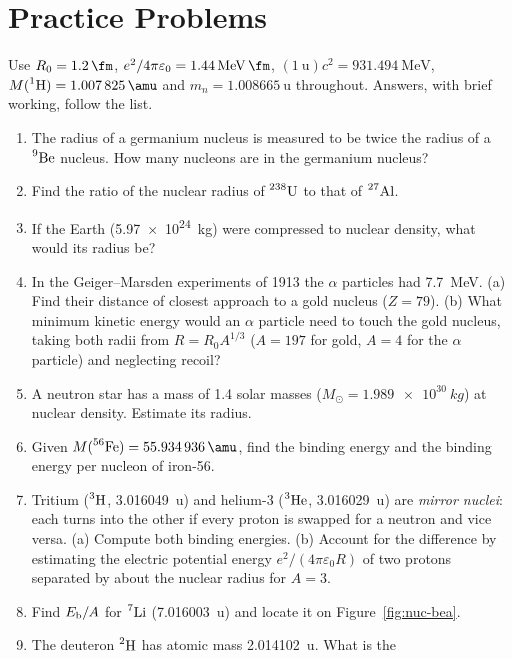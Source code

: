 \section{Practice Problems}\label{sec:nuc-practice}

Use $R_0=\SI{1.2}{\fm}$, $e^2/4\pi\varepsilon_0=\SI{1.44}{\MeV.\fm}$, $(\SI{1}{\amu})c^2=\SI{931.494}{\MeV}$,
$M(\iso{1}{H})=\SI{1.007825}{\amu}$ and $m_n=\SI{1.008665}{\amu}$ throughout. Answers, with brief working,
follow the list.

\begin{enumerate}[itemsep=3pt]
\item\label{pp:nuc-ge} The radius of a germanium nucleus is measured to be twice the radius of a
$\prescript{9}{}{\mathrm{Be}}$ nucleus. How many nucleons are in the germanium nucleus?
\item\label{pp:nuc-ual} Find the ratio of the nuclear radius of $\prescript{238}{}{\mathrm{U}}$ to that of $\prescript{27}{}{\mathrm{Al}}$.
\item\label{pp:nuc-earth} If the Earth (\SI{5.97e24}{kg}) were compressed to nuclear density, what would
its radius be?
\item\label{pp:nuc-closest} In the Geiger--Marsden experiments of 1913 the $\alpha$ particles had
\SI{7.7}{\MeV}. (a) Find their distance of closest approach to a gold nucleus ($Z=79$). (b) What minimum
kinetic energy would an $\alpha$ particle need to touch the gold nucleus, taking both radii from
$R=R_0A^{1/3}$ ($A=197$ for gold, $A=4$ for the $\alpha$ particle) and neglecting recoil?
\item\label{pp:nuc-neutronstar} A neutron star has a mass of 1.4 solar masses
($M_\odot=\SI{1.989e30}{kg}$) at nuclear density. Estimate its radius.
\item\label{pp:nuc-fe} Given $M(\iso{56}{Fe})=\SI{55.934936}{\amu}$, find the binding energy and the
binding energy per nucleon of iron-56.
\item\label{pp:nuc-mirror} Tritium ($\prescript{3}{}{\mathrm{H}}$, \SI{3.016049}{\amu}) and helium-3 ($\prescript{3}{}{\mathrm{He}}$,
\SI{3.016029}{\amu}) are \emph{mirror nuclei}: each turns into the other if every proton is swapped for a
neutron and vice versa. (a) Compute both binding energies. (b) Account for the difference by estimating
the electric potential energy $e^2/(4\pi\varepsilon_0R)$ of two protons separated by about the nuclear
radius for $A=3$.
\item\label{pp:nuc-li7} Find $E_{\mathrm{b}}/A$ for $\prescript{7}{}{\mathrm{Li}}$ (\SI{7.016003}{\amu}) and locate it on
Figure~\ref{fig:nuc-bea}.
\item\label{pp:nuc-deut} The deuteron $\prescript{2}{}{\mathrm{H}}$ has atomic mass \SI{2.014102}{\amu}. What is the

\end{enumerate}

